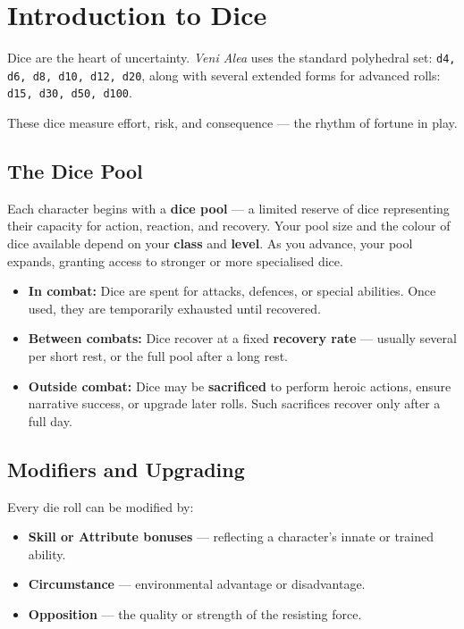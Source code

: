 \section{Introduction to Dice}

\noindent
Dice are the heart of uncertainty.  
\textit{Veni Alea} uses the standard polyhedral set:
\texttt{d4, d6, d8, d10, d12, d20}, along with several extended forms for advanced rolls:
\texttt{d15, d30, d50, d100}.  

These dice measure effort, risk, and consequence — the rhythm of fortune in play.

\subsection*{The Dice Pool}

Each character begins with a \textbf{dice pool} — a limited reserve of dice representing their capacity for action, reaction, and recovery.  
Your pool size and the colour of dice available depend on your \textbf{class} and \textbf{level}.  
As you advance, your pool expands, granting access to stronger or more specialised dice.

\begin{itemize}
  \item \textbf{In combat:} Dice are spent for attacks, defences, or special abilities.  
  Once used, they are temporarily exhausted until recovered.
  \item \textbf{Between combats:} Dice recover at a fixed \textbf{recovery rate} — usually several per short rest, or the full pool after a long rest.
  \item \textbf{Outside combat:} Dice may be \textbf{sacrificed} to perform heroic actions, ensure narrative success, or upgrade later rolls.  
  Such sacrifices recover only after a full day.
\end{itemize}

\subsection*{Modifiers and Upgrading}

Every die roll can be modified by:
\begin{itemize}
  \item \textbf{Skill or Attribute bonuses} — reflecting a character’s innate or trained ability.
  \item \textbf{Circumstance} — environmental advantage or disadvantage.
  \item \textbf{Opposition} — the quality or strength of the resisting force.
\end{itemize}

